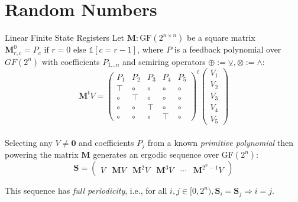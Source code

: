 \documentclass{beamer}
\begin{document}
    \section{Random Numbers}

    \begin{frame}{Linear Finite State Registers}
        Let $\textbf{M}: \text{GF}(2^{n\times n})$ be a square matrix $\mathbf{M}^0_{r, c} = P_c \text{ if } r=0 \text{ else } \mathds{1}[c = r - 1]$, where $P$ is a feedback polynomial over $GF(2^n)$ with coefficients $P_{1\ldots n}$ and semiring operators $\oplus := \veebar, \otimes := \land$:\\

        \[
            \mathbf{M}^tV = \begin{pmatrix}
                                P_1 & P_2 & P_3 & P_4 & P_5 \\
                                \top & \circ & \circ & \circ & \circ \\
                                \circ & \top & \circ & \circ & \circ \\
                                \circ & \circ & \top & \circ & \circ \\
                                \circ & \circ & \circ & \top & \circ
            \end{pmatrix}^t
            \begin{pmatrix}
                V_1 \\
                V_2 \\
                V_3 \\
                V_4 \\
                V_5
            \end{pmatrix}
        \]\\

        Selecting any $V \neq \mathbf{0}$ and coefficients $P_j$ from a known \textit{primitive polynomial} then powering the matrix $\mathbf{M}$ generates an ergodic sequence over GF$(2^n)$:\\

        \[
        \mathbf{S} = \begin{pmatrix}V & \mathbf{M}V & \mathbf{M}^{2}V & \mathbf{M}^{3}V & \cdots & \mathbf{M}^{2^n-1}V \end{pmatrix}
        \]

        This sequence has \textit{full periodicity}, i.e., for all $i, j \in [0, 2^n), \mathbf{S}_i = \mathbf{S}_j \Rightarrow i = j$.
    \end{frame}
\end{document}
